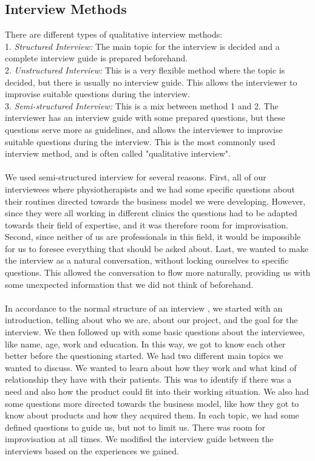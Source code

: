 \subsection{Interview Methods}
There are different types of qualitative interview methods: \\ 
1. \emph{Structured Interview:} The main topic for the interview is decided and a complete interview guide is prepared beforehand. \\ 
2. \emph{Unstructured Interview:} This is a very flexible method where the topic is decided, but there is usually no interview guide. This allows the interviewer to improvise suitable questions during the interview. \\ 
3. \emph{Semi-structured Interview:} This is a mix between method 1 and 2. The interviewer has an interview guide with some prepared questions, but these questions serve more as guidelines, and allows the interviewer to improvise suitable questions during the interview. This is the most commonly used interview method, and is often called "qualitative interview". \cite{interview} \cite{interview2} \\ \\
We used semi-structured interview for several reasons. First, all of our interviewees where physiotherapists and we had some specific questions about their routines directed towards the business model we were developing. However, since they were all working in different clinics the questions had to be adapted towards their field of expertise, and it was therefore room for improvisation. Second, since neither of us are professionals in this field, it would be impossible for us to foresee everything that should be asked about. Last, we wanted to make the interview as a natural conversation, without locking ourselves to specific questions. This allowed the conversation to flow more naturally, providing us with some unexpected information that we did not think of beforehand. \\ \\
In accordance to the normal structure of an interview \cite{interview2}, we started with an introduction, telling about who we are, about our project, and the goal for the interview. We then followed up with some basic questions about the interviewee, like name, age, work and education. In this way, we got to know each other better before the questioning started. We had two different main topics we wanted to discuss. We wanted to learn about how they work and what kind of relationship they have with their patients. This was to identify if there was a need and also how the product could fit into their working situation. We also had some questions more directed towards the business model, like how they got to know about products and how they acquired them. In each topic, we had some defined questions to guide us, but not to limit us. There was room for improvisation at all times. We modified the interview guide between the interviews based on the experiences we gained.

